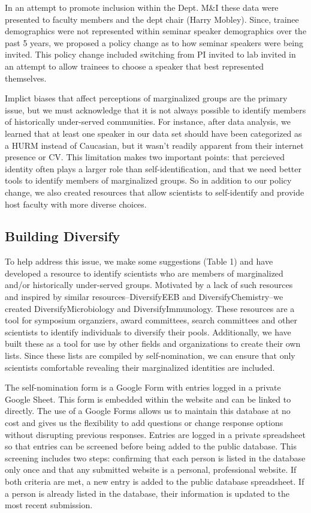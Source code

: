 \documentclass[10pt,]{article}
\begin{document}
In an attempt to promote inclusion within the Dept. M\&I these data were
presented to faculty members and the dept chair (Harry Mobley). Since,
trainee demographics were not represented within seminar speaker
demographics over the past 5 years, we proposed a policy change as to
how seminar speakers were being invited. This policy change included
switching from PI invited to lab invited in an attempt to allow trainees
to choose a speaker that best represented themselves.

Implict biases that affect perceptions of marginalized groups are the
primary issue, but we must acknowledge that it is not always possible to
identify members of historically under-served communities. For instance,
after data analysis, we learned that at least one speaker in our data
set should have been categorized as a HURM instead of Caucasian, but it
wasn't readily apparent from their internet presence or CV. This
limitation makes two important points: that percieved identity often
plays a larger role than self-identification, and that we need better
tools to identify members of marginalized groups. So in addition to our
policy change, we also created resources that allow scientists to
self-identify and provide host faculty with more diverse choices.

\subsection{Building Diversify}\label{building-diversify}

To help address this issue, we make some suggestions (Table 1) and have
developed a resource to identify scientists who are members of
marginalized and/or historically under-served groups. Motivated by a
lack of such resources and inspired by similar resources--DiversifyEEB
and DiversifyChemistry--we created DiversifyMicrobiology and
DiversifyImmunology. These resources are a tool for symposium
organziers, award committees, search committees and other scientists to
identify individuals to diversify their pools. Additionally, we have
built these as a tool for use by other fields and organizations to
create their own lists. Since these lists are compiled by
self-nomination, we can ensure that only scientists comfortable
revealing their marginalized identities are included.

The self-nomination form is a Google Form with entries logged in a
private Google Sheet. This form is embedded within the website and can
be linked to directly. The use of a Google Forms allows us to maintain
this database at no cost and gives us the flexibility to add questions
or change response options without disrupting previous responses.
Entries are logged in a private spreadsheet so that entries can be
screened before being added to the public database. This screening
includes two steps: confirming that each person is listed in the
database only once and that any submitted website is a personal,
professional website. If both criteria are met, a new entry is added to
the public database spreadsheet. If a person is already listed in the
database, their information is updated to the most recent submission.
\end{document}
